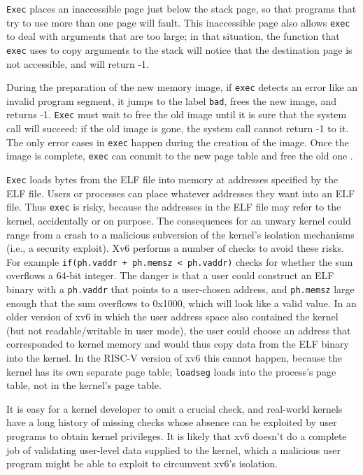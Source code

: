 \lstinline{Exec}
places an inaccessible page just below the stack page,
so that programs that try to use more than one page will fault.
This inaccessible page also allows
\lstinline{exec}
to deal with arguments that are too large;
in that situation,
the
function that
\lstinline{exec}
uses to copy arguments to the stack will notice that
the destination page is not accessible, and will
return -1.

During the preparation of the new memory image,
if
\lstinline{exec}
detects an error like an invalid program segment,
it jumps to the label
\lstinline{bad},
frees the new image,
and returns -1.
\lstinline{Exec}
must wait to free the old image until it
is sure that the system call will succeed:
if the old image is gone,
the system call cannot return -1 to it.
The only error cases in
\lstinline{exec}
happen during the creation of the image.
Once the image is complete,
\lstinline{exec}
can commit to the new page table
and free the old one
.

\lstinline{Exec}
loads bytes from the ELF file into memory at addresses specified by the ELF file.
Users or processes can place whatever addresses they want into an ELF file.
Thus
\lstinline{exec}
is risky, because the addresses in the ELF file may refer to the kernel, accidentally
or on purpose. The consequences for an unwary kernel could range from
a crash to a malicious subversion of the kernel's isolation mechanisms
(i.e., a security exploit).
Xv6 performs a number of checks to avoid these risks.
For example
\lstinline{if(ph.vaddr + ph.memsz < ph.vaddr)}
checks for whether the sum overflows a 64-bit integer.
The danger is that a user could construct an ELF binary with a
\lstinline{ph.vaddr}
that points to a user-chosen address,
and
\lstinline{ph.memsz}
large enough that the sum overflows to 0x1000, which will look like a
valid value. In an older version of xv6 in which the user address
space also contained the kernel (but not readable/writable in user
mode), the user could choose an address that corresponded to kernel
memory and would thus copy data from the ELF binary into the kernel.
In the RISC-V version of xv6 this cannot happen, because the kernel has
its own separate page table;
\lstinline{loadseg}
loads into the process's page table, not in the kernel's page table.

It is easy for a kernel developer to omit a crucial check, and
real-world kernels have a long history of missing checks whose absence
can be exploited by user programs to obtain kernel privileges.  It is likely that xv6 doesn't do a complete job of validating
user-level data supplied to the kernel, which a malicious user program might be able to exploit to circumvent xv6's isolation.
